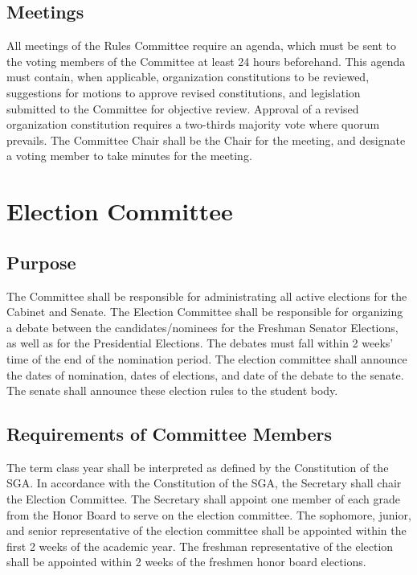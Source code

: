 \documentclass[12pt]{scrreprt}
\begin{document}
\subsection{Meetings}
All meetings of the Rules Committee require an agenda, which must be sent to the voting
members of the Committee at least 24 hours beforehand. This agenda must contain, when
applicable, organization constitutions to be reviewed, suggestions for motions to approve
revised constitutions, and legislation submitted to the Committee for objective review.
Approval of a revised organization constitution requires a two-thirds majority vote where
quorum prevails. The Committee Chair shall be the Chair for the meeting, and designate a
voting member to take minutes for the meeting.


\section{Election Committee}

\subsection{Purpose}
The Committee shall be responsible for administrating all active elections for 
the Cabinet and Senate. The Election Committee shall be responsible for organizing a debate between the candidates/nominees for the Freshman Senator Elections, as well as for the
Presidential Elections. The debates must fall within 2 weeks’ time of the end of the
nomination period. The election committee shall announce the dates of
nomination, dates of elections, and date of the debate to the senate. The senate
shall announce these election rules to the student body. 

\subsection{Requirements of Committee Members}
The term class year shall be interpreted as defined by the Constitution of the 
SGA. In accordance with the Constitution of the SGA, the Secretary shall chair the Election Committee. The Secretary shall appoint one member of each grade from
the Honor Board to serve on the election committee. The sophomore, junior, and
senior representative of the election committee shall be appointed within the first 2
weeks of the academic year. The freshman representative of the election shall be
appointed within 2 weeks of the freshmen honor board elections.
\end{document}
